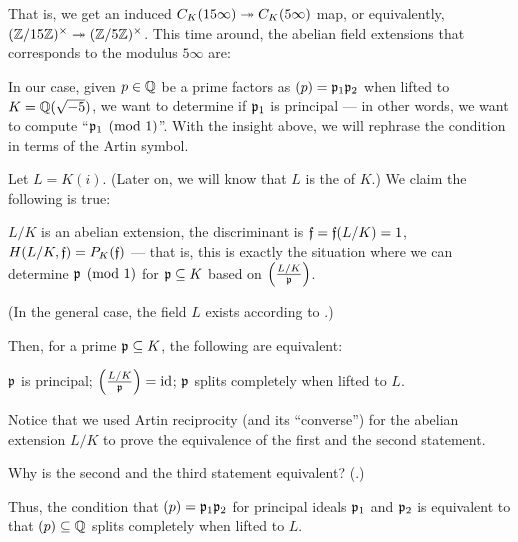 \begin{example}
	That is, we get an induced $C_K(15 \infty) \twoheadrightarrow C_K(5 \infty)$ map,
	or equivalently, $(\mathbb Z/15\mathbb Z)^\times \twoheadrightarrow (\mathbb Z/5\mathbb Z)^\times$.
	This time around, the abelian field extensions that corresponds to the modulus $5 \infty$ are:
	\begin{center}
	\end{center}
\end{example}

In our case, given $p \in \mathbb Q$ be a prime factors as $(p) = \mathfrak p_1 \mathfrak p_2$ when lifted to
$K = \mathbb Q(\sqrt{-5})$, we want to determine if $\mathfrak p_1$ is principal --- in other words, we want to
compute ``$\mathfrak p_1 \pmod{1}$''.
With the insight above, we will rephrase the condition in terms of the Artin symbol.

Let $L = K(i)$. (Later on, we will know that $L$ is the  of $K$.)
We claim the following is true:
\begin{itemize}
	\ii $L/K$ is an abelian extension,
	\ii the discriminant is $\mathfrak f = \mathfrak f(L/K) = 1$,
	\ii $H(L/K, \mathfrak f) = P_K(\mathfrak f)$ --- that is, this is exactly the situation where we can determine
	$\mathfrak p \pmod{1}$ for $\mathfrak p \subseteq K$ based on $\left(\frac{L/K}{\mathfrak p}\right)$.
\end{itemize}

(In the general case, the field $L$ exists according to .)

Then, for a prime $\mathfrak p \subseteq K$, the following are equivalent:
\begin{enumerate}
	\ii $\mathfrak p$ is principal;
	\ii $\left(\frac{L/K}{\mathfrak p}\right) = \mathrm{id}$;
	\ii $\mathfrak p$ splits completely when lifted to $L$.
\end{enumerate}

Notice that we used Artin reciprocity (and its ``converse'') for the abelian extension $L/K$
to prove the equivalence of the first and the second statement.
\begin{exercise}
	Why is the second and the third statement equivalent?
	(.)
\end{exercise}

Thus, the condition that $(p) = \mathfrak p_1 \mathfrak p_2$ for principal ideals $\mathfrak p_1$ and $\mathfrak p_2$ is equivalent
to that $(p) \subseteq \mathbb Q$ splits completely when lifted to $L$.

